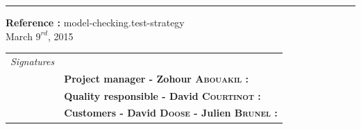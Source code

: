 \documentclass{report}
\begin{document}
\begin{titlepage}


\vspace*{4.5cm}

\noindent
\begin{minipage}{0.35\linewidth}
    \begin{flushright}
        \printauthor
    \end{flushright}
\end{minipage} \hspace{15pt}
%
\begin{minipage}{0.02\linewidth}
    \rule{1pt}{175pt}
\end{minipage} \hspace{-10pt}
%
\begin{minipage}{0.6\linewidth}
\vspace{5pt}
\newenvironment{test}{\begin{center}}{\end{center}}
\hspace{10pt}
\begin{minipage}{\linewidth} 
\textbf{Reference :} model-checking.test-strategy ~\\
March $9^{rd}$, 2015
\end{minipage}
\end{minipage}

\vspace{8cm}
\begin{minipage}{0.20\linewidth}
    \begin{flushright}
       
        \begin{tabular}{ll}
	 \textit{Signatures} & \\
			& \textbf{Project manager - Zohour \textsc{Abouakil} :} \\
            & \textbf{Quality responsible - David \textsc{Courtinot} :} \\
            & \textbf{Customers - David \textsc{Doose} - Julien \textsc{Brunel} :} \\
        \end{tabular}
    \end{flushright}
\end{minipage}

\end{titlepage}
\restoregeometry
\tableofcontents
{}
\end{document}

